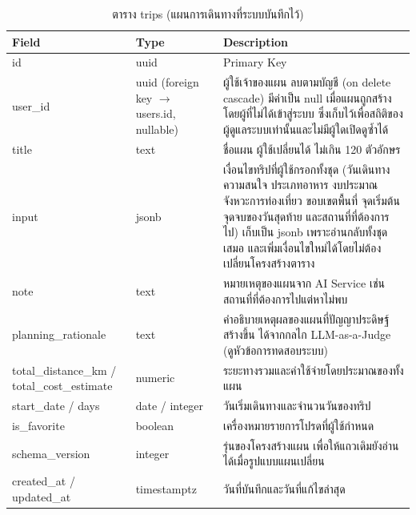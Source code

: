 \begin{table}[H]
\centering
\caption{ตาราง trips (แผนการเดินทางที่ระบบบันทึกไว้)}
\label{tab:db_trips}
\begin{tabular}{|p{3.6cm}|p{2.6cm}|p{6.8cm}|}
\hline
\textbf{Field} & \textbf{Type} & \textbf{Description} \\
\hline
id & uuid & Primary Key \\ \hline
user\_id & uuid (foreign key $\to$ users.id, nullable) & ผู้ใช้เจ้าของแผน ลบตามบัญชี (on delete cascade) มีค่าเป็น null เมื่อแผนถูกสร้างโดยผู้ที่ไม่ได้เข้าสู่ระบบ ซึ่งเก็บไว้เพื่อสถิติของผู้ดูแลระบบเท่านั้นและไม่มีผู้ใดเปิดดูซ้ำได้ \\ \hline
title & text & ชื่อแผน ผู้ใช้เปลี่ยนได้ ไม่เกิน 120 ตัวอักษร \\ \hline
input & jsonb & เงื่อนไขทริปที่ผู้ใช้กรอกทั้งชุด (วันเดินทาง ความสนใจ ประเภทอาหาร งบประมาณ จังหวะการท่องเที่ยว ขอบเขตพื้นที่ จุดเริ่มต้น จุดจบของวันสุดท้าย และสถานที่ที่ต้องการไป) เก็บเป็น jsonb เพราะอ่านกลับทั้งชุดเสมอ และเพิ่มเงื่อนไขใหม่ได้โดยไม่ต้องเปลี่ยนโครงสร้างตาราง \\ \hline
note & text & หมายเหตุของแผนจาก AI Service เช่น สถานที่ที่ต้องการไปแต่หาไม่พบ \\ \hline
planning\_rationale & text & คำอธิบายเหตุผลของแผนที่ปัญญาประดิษฐ์ สร้างขึ้น ได้จากกลไก LLM-as-a-Judge (ดูหัวข้อการทดสอบระบบ) \\ \hline
total\_distance\_km / total\_cost\_estimate & numeric & ระยะทางรวมและค่าใช้จ่ายโดยประมาณของทั้งแผน \\ \hline
start\_date / days & date / integer & วันเริ่มเดินทางและจำนวนวันของทริป \\ \hline
is\_favorite & boolean & เครื่องหมายรายการโปรดที่ผู้ใช้กำหนด \\ \hline
schema\_version & integer & รุ่นของโครงสร้างแผน เพื่อให้แถวเดิมยังอ่านได้เมื่อรูปแบบแผนเปลี่ยน \\ \hline
created\_at / updated\_at & timestamptz & วันที่บันทึกและวันที่แก้ไขล่าสุด \\
\hline
\end{tabular}
\end{table}

